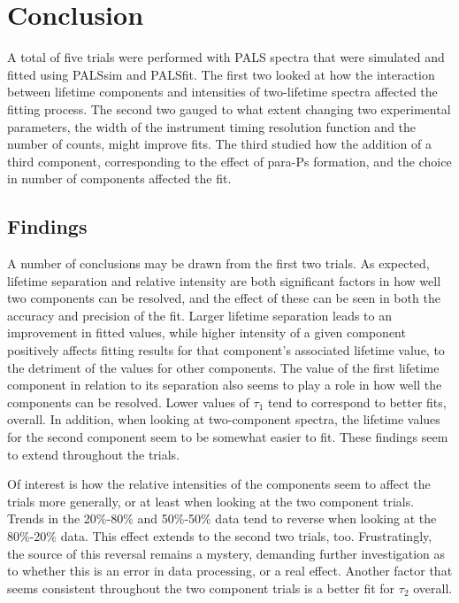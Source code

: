 \chapter{Conclusion}

A total of five trials were performed with PALS spectra that were simulated and fitted using PALSsim and PALSfit. The first two looked at how the interaction between lifetime components and intensities of two-lifetime spectra affected the fitting process. The second two gauged to what extent changing two experimental parameters, the width of the instrument timing resolution function and the number of counts, might improve fits. The third studied how the addition of a third component, corresponding to the effect of para-Ps formation, and the choice in number of components affected the fit.

\section{Findings}

A number of conclusions may be drawn from the first two trials. As expected, lifetime separation and relative intensity are both significant factors in how well two components can be resolved, and the effect of these can be seen in both the accuracy and precision of the fit. Larger lifetime separation leads to an improvement in fitted values, while higher intensity of a given component positively affects fitting results for that component's associated lifetime value, to the detriment of the values for other components. The value of the first lifetime component in relation to its separation also seems to play a role in how well the components can be resolved. Lower values of $\tau_1$ tend to correspond to better fits, overall. In addition, when looking at two-component spectra, the lifetime values for the second component seem to be somewhat easier to fit. These findings seem to extend throughout the trials.

Of interest is how the relative intensities of the components seem to affect the trials more generally, or at least when looking at the two component trials. Trends in the 20\%-80\% and 50\%-50\% data tend to reverse when looking at the 80\%-20\% data. This effect extends to the second two trials, too. Frustratingly, the source of this reversal remains a mystery, demanding further investigation as to whether this is an error in data processing, or a real effect. Another factor that seems consistent throughout the two component trials is a better fit for $\tau_2$ overall.


